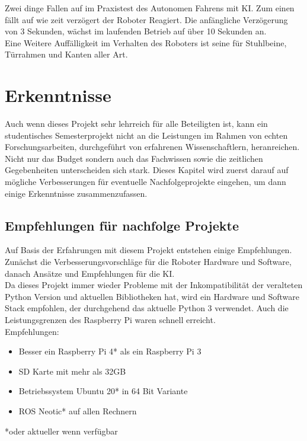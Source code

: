 \documentclass[conference]{IEEEtran}
\begin{document}
Zwei dinge Fallen auf im Praxistest des Autonomen Fahrens mit KI. Zum 
einen fällt auf wie zeit verzögert der Roboter Reagiert. Die anfängliche 
Verzögerung von 3 Sekunden, wächst im laufenden 
Betrieb auf über 10 Sekunden an. \\
Eine Weitere Auffälligkeit im Verhalten des Roboters ist seine  
für Stuhlbeine, Türrahmen und Kanten aller Art. 



	\section{Erkenntnisse }
	Auch wenn dieses Projekt sehr lehrreich für alle Beteiligten ist, kann ein studentisches Semesterprojekt nicht an die Leistungen im Rahmen von echten Forschungsarbeiten, durchgeführt von erfahrenen Wissenschaftlern, heranreichen. Nicht nur das Budget sondern auch das Fachwissen sowie die zeitlichen Gegebenheiten unterscheiden sich stark. Dieses Kapitel wird zuerst darauf auf mögliche Verbesserungen für eventuelle Nachfolgeprojekte eingehen, um dann einige Erkenntnisse zusammenzufassen. 
	
	\subsection{Empfehlungen für nachfolge Projekte}
	
	 Auf Basis der Erfahrungen mit diesem Projekt entstehen einige 
	 Empfehlungen. Zunächst die Verbesserungsvorschläge für die Roboter 
	 Hardware und Software, danach Ansätze und Empfehlungen für die KI.\\
	Da dieses Projekt immer wieder Probleme mit der Inkompatibilität der veralteten Python Version und aktuellen Bibliotheken hat, wird ein Hardware und Software Stack empfohlen, der durchgehend das aktuelle Python 3 verwendet. Auch die Leistungsgrenzen des Raspberry Pi waren schnell erreicht. \\
	
	Empfehlungen:
	\begin{itemize}
		\item  Besser ein Raspberry Pi 4* als ein Raspberry Pi 3
		\item  SD Karte mit mehr als 32GB
		\item Betriebssystem Ubuntu 20* in 64 Bit Variante
		\item  ROS Neotic* auf allen Rechnern
	\end{itemize}
	*oder aktueller wenn verfügbar
\end{document}
